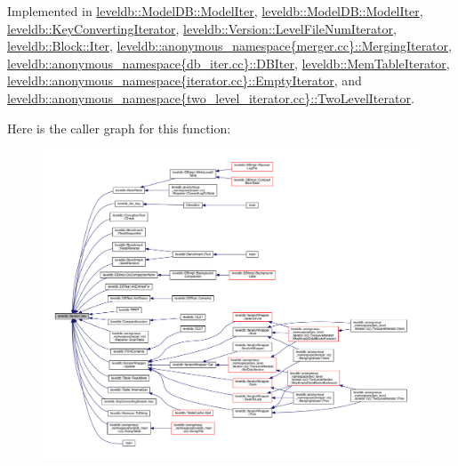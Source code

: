 Implemented in \hyperlink{classleveldb_1_1_model_d_b_1_1_model_iter_a53ff9e91d51bc5bcab4585758a103749}{leveldb\+::\+Model\+D\+B\+::\+Model\+Iter}, \hyperlink{classleveldb_1_1_model_d_b_1_1_model_iter_a53ff9e91d51bc5bcab4585758a103749}{leveldb\+::\+Model\+D\+B\+::\+Model\+Iter}, \hyperlink{classleveldb_1_1_key_converting_iterator_a46402aaa27d57c5b2bee4f560c2dc04b}{leveldb\+::\+Key\+Converting\+Iterator}, \hyperlink{classleveldb_1_1_version_1_1_level_file_num_iterator_a8c2ee5f532fd05b2864f8d69d5c01f45}{leveldb\+::\+Version\+::\+Level\+File\+Num\+Iterator}, \hyperlink{classleveldb_1_1_block_1_1_iter_a1378d5e1fb17638427fd0a0f7fc7a010}{leveldb\+::\+Block\+::\+Iter}, \hyperlink{classleveldb_1_1anonymous__namespace_02merger_8cc_03_1_1_merging_iterator_ab550733bf777801115b5cf0b248c1a2d}{leveldb\+::anonymous\+\_\+namespace\{merger.\+cc\}\+::\+Merging\+Iterator}, \hyperlink{classleveldb_1_1anonymous__namespace_02db__iter_8cc_03_1_1_d_b_iter_a3553118d800278eb9ab467c64de063a6}{leveldb\+::anonymous\+\_\+namespace\{db\+\_\+iter.\+cc\}\+::\+D\+B\+Iter}, \hyperlink{classleveldb_1_1_mem_table_iterator_a3e9b1c478d4ba8747dae4c8acb77a289}{leveldb\+::\+Mem\+Table\+Iterator}, \hyperlink{classleveldb_1_1anonymous__namespace_02iterator_8cc_03_1_1_empty_iterator_a35d33d6c74920f95560dbad9dd2f1752}{leveldb\+::anonymous\+\_\+namespace\{iterator.\+cc\}\+::\+Empty\+Iterator}, and \hyperlink{classleveldb_1_1anonymous__namespace_02two__level__iterator_8cc_03_1_1_two_level_iterator_a5e241c775eac2a1a9834ebf2f152bfe5}{leveldb\+::anonymous\+\_\+namespace\{two\+\_\+level\+\_\+iterator.\+cc\}\+::\+Two\+Level\+Iterator}.



Here is the caller graph for this function\+:
\nopagebreak
\begin{figure}[H]
\begin{center}
\leavevmode
\includegraphics[width=350pt]{classleveldb_1_1_iterator_ad17feced6e24a1b21db5ae6940c1f220_icgraph}
\end{center}
\end{figure}


